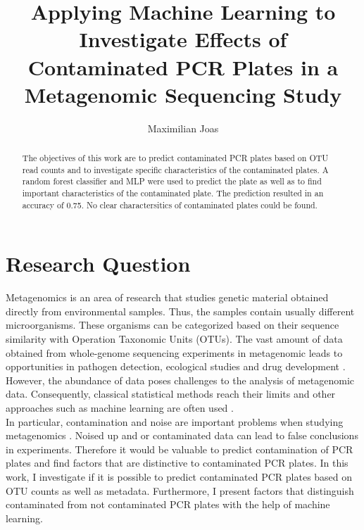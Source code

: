 \documentclass{svproc}
\begin{document}
\mainmatter              %
%
\title{Applying Machine Learning to Investigate Effects of Contaminated PCR Plates in a Metagenomic Sequencing Study}
%
%
\author{Maximilian Joas }
%
%
%
%
\maketitle              %
%
\begin{abstract}
 The objectives of this work are to predict contaminated PCR plates based on OTU read counts and to investigate specific characteristics of the contaminated plates. A random forest classifier and MLP were used to predict the plate as well as to find important characteristics of the contaminated plate. The prediction resulted in an accuracy of 0.75. No clear charactersitics of contaminated plates could be found.
\end{abstract}
%
%
\section{Research Question}
%
Metagenomics is an area of research that studies genetic material obtained directly from environmental samples. Thus, the samples contain usually different microorganisms. These organisms can be categorized based on their sequence similarity with Operation Taxonomic Units (OTUs). The vast amount of data obtained from whole-genome sequencing experiments in metagenomic leads to opportunities in pathogen detection, ecological studies and drug development \cite{chiu2019clinical}\cite{junemann2017bioinformatics}. However, the abundance of data poses challenges to the analysis of metagenomic data. Consequently, classical statistical methods reach their limits and other approaches such as machine learning are often used \cite{Soueidan2017}.\\
In particular, contamination and noise are important problems when studying metagenomics \cite{eisenhofer2019contamination}. Noised up and or contaminated data can lead to false conclusions in experiments. Therefore it would be valuable to predict contamination of PCR plates and find factors that are distinctive to contaminated PCR plates. In this work, I investigate if it is possible to predict contaminated PCR plates based on OTU counts as well as metadata. Furthermore, I present factors that distinguish contaminated from not contaminated PCR plates with the help of machine learning.
\end{document}
